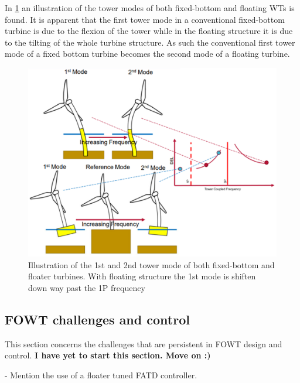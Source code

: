 In \cref{fig:eigen_and_1p3p} an illustration of the tower modes of both fixed-bottom and floating WTs is found. It is apparent that the first tower mode in a conventional fixed-bottom turbine is due to the flexion of the tower while in the floating structure it is due to the tilting of the whole turbine structure. As such the conventional first tower mode of a fixed bottom turbine becomes the second mode of a floating turbine.
\begin{figure}[ht]
	\centering
	\includegraphics[width=0.7\linewidth]{Graphics/1P3PandEigenFloater.png}
	\caption{Illustration of the 1st and 2nd tower mode of both fixed-bottom and floater turbines. With floating structure the 1st mode is shiften down way past the 1P frequency}
	\label{fig:eigen_and_1p3p}
\end{figure}


\subsection{FOWT challenges and control} \label{sec:theo_fowt_challenges}
This section concerns the challenges that are persistent in FOWT design and control. \textbf{I have yet to start this section. Move on :)}



- Mention the use of a floater tuned FATD controller.
